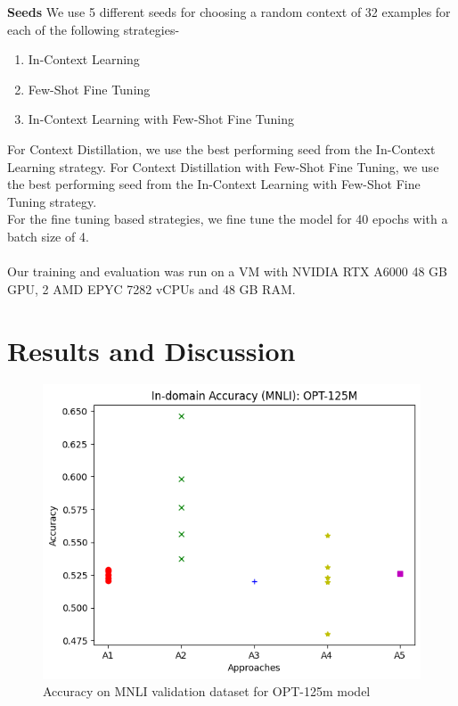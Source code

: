 \documentclass[10pt,twocolumn,letterpaper]{article}
\begin{document}
\textbf{Seeds} We use 5 different seeds for choosing a random context of 32 examples for each of the following strategies-
\begin{enumerate}
    \item In-Context Learning
    \item Few-Shot Fine Tuning
    \item In-Context Learning with Few-Shot Fine Tuning
\end{enumerate}
For Context Distillation, we use the best performing seed from the In-Context Learning strategy. For Context Distillation with Few-Shot Fine Tuning, we use the best performing seed from the In-Context Learning with Few-Shot Fine Tuning strategy.\\

For the fine tuning based strategies, we fine tune the model for 40 epochs with a batch size of 4.\\\\
Our training and evaluation was run on a VM with NVIDIA RTX A6000 48 GB GPU, 2 AMD EPYC 7282 vCPUs and 48 GB RAM.


	

\newpage
\section{Results and Discussion}

\begin{figure}[h]
\begin{center}
\includegraphics[width=0.8\linewidth]{figures/opt-125m-accuracy.png}
\end{center}
\caption{Accuracy on MNLI validation dataset for OPT-125m model}
\end{figure}
\end{document}
